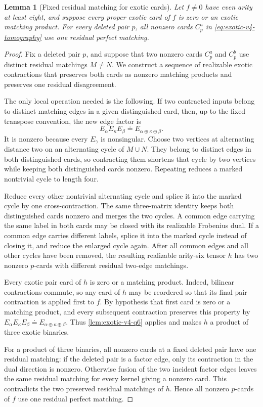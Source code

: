 \documentclass[11pt,letterpaper,onecolumn]{article}
\theoremstyle{plain}
\newtheorem{lemma}[lemma]{Lemma}
\theoremstyle{definition}
\theoremstyle{remark}
\begin{document}
\begin{lemma}[Fixed residual matching for exotic cards]
\label{lem:exotic-v4-fixed-ruling}
Let \(f\ne0\) have even arity at least eight, and suppose every proper exotic
card of \(f\) is zero or an exotic matching product.  For every deleted
pair \(p\), all nonzero cards \(C_p^a\) in
\cref{eq:exotic-v4-tomography} use one residual perfect matching.
\end{lemma}

\begin{proof}
Fix a deleted pair \(p\), and suppose that two nonzero cards
\(C_p^a\) and \(C_p^b\) use distinct residual matchings \(M\ne N\).  We
construct a sequence of realizable exotic contractions that preserves both
cards as nonzero matching products and preserves one residual disagreement.

The only local operation needed is the following.  If two contracted inputs
belong to distinct matching edges in a given distinguished card, then, up to the fixed
transpose convention, the new edge factor is
\[
 E_\alpha E_\kappa E_\beta\doteq
 E_{\alpha\oplus\kappa\oplus\beta}.
\]
It is nonzero because every \(E_\gamma\) is nonsingular.  Choose two
vertices at alternating distance two on an alternating cycle of
\(M\cup N\).  They belong to distinct edges in both distinguished cards, so contracting
them shortens that cycle by two vertices while keeping both distinguished
cards nonzero.  Repeating reduces a marked nontrivial cycle to length four.

Reduce every other nontrivial alternating cycle and splice it into the
marked cycle by one cross-contraction. The same three-matrix identity keeps
both distinguished cards nonzero and merges the two cycles.  A common edge
carrying the same label in both cards may be closed with its realizable
Frobenius dual.  If
a common edge carries different labels, splice it into the marked cycle
instead of closing it, and reduce the enlarged cycle again.  After all
common edges and all other cycles have been removed, the resulting realizable
arity-six tensor \(h\) has two nonzero \(p\)-cards with different residual
two-edge matchings.

Every exotic pair card of \(h\) is zero or a matching product.  Indeed,
bilinear contractions commute, so any card of \(h\) may be reordered so
that its final pair contraction is applied first to \(f\).  By hypothesis
that first card is zero or a matching product, and every subsequent
contraction preserves this property by
\(E_\alpha E_\kappa E_\beta\doteq
E_{\alpha\oplus\kappa\oplus\beta}\).  Thus
\cref{lem:exotic-v4-q6} applies and makes \(h\) a product of three exotic
binaries.

For a product of three binaries, all nonzero cards at a fixed deleted pair
have one residual matching: if the deleted pair is a factor edge, only its
contraction in the dual direction is nonzero. Otherwise fusion of the two incident factor edges
leaves the same residual matching for every kernel giving a nonzero card.  This contradicts
the two preserved residual matchings of \(h\).  Hence all nonzero \(p\)-cards of \(f\)
use one residual perfect matching.
\end{proof}
\end{document}
